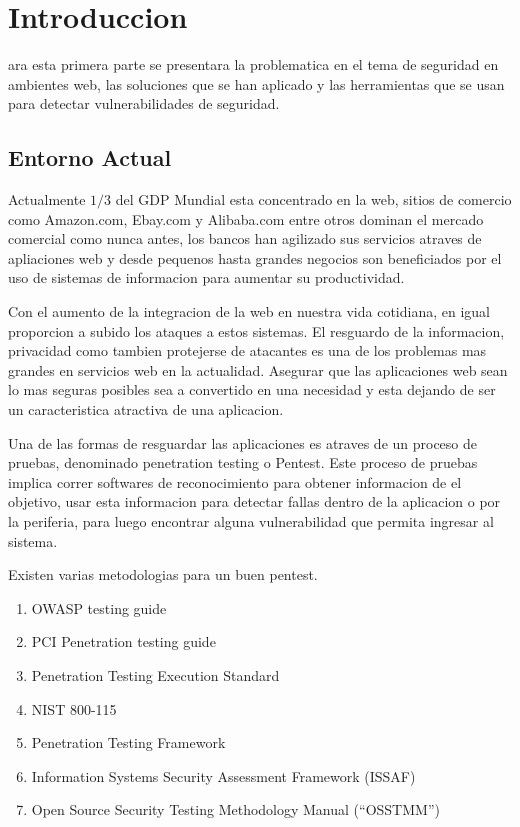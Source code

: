 %
%
\let\textcircled=\pgftextcircled
\chapter{Introduccion}
\label{chap:intro}

ara esta primera parte se presentara la problematica en el tema de seguridad en ambientes web, las soluciones que se han aplicado y las herramientas que se usan para detectar vulnerabilidades de seguridad.

\section{Entorno Actual}
\label{sec:sec01}

Actualmente $1/3$ del GDP Mundial esta concentrado en la web, sitios de comercio como Amazon.com, Ebay.com y Alibaba.com entre otros dominan el mercado comercial como nunca antes, los bancos han agilizado sus servicios atraves de apliaciones web y desde pequenos hasta grandes negocios son beneficiados por el uso de sistemas de informacion para aumentar su productividad.

Con el aumento de la integracion de la web en nuestra vida cotidiana, en igual proporcion a subido los ataques a estos sistemas. El resguardo de la informacion, privacidad como tambien  protejerse de atacantes es una de los problemas mas grandes en servicios web en la actualidad. Asegurar que las aplicaciones web sean lo mas seguras posibles sea a convertido en una necesidad y esta dejando de ser un caracteristica atractiva de una aplicacion.

Una de las formas de resguardar las aplicaciones es atraves de un proceso de pruebas, denominado penetration testing o Pentest. Este proceso de pruebas implica correr softwares de reconocimiento para obtener informacion de el objetivo, usar esta informacion para detectar fallas dentro de la aplicacion o por la periferia, para luego encontrar alguna vulnerabilidad que permita ingresar al sistema.

Existen varias metodologias para un buen pentest. \cite{OWASP}

\begin{enumerate}
\item{OWASP testing guide}
\item{PCI Penetration testing guide}
\item{Penetration Testing Execution Standard}
\item{NIST 800-115}
\item{Penetration Testing Framework}
\item{Information Systems Security Assessment Framework (ISSAF)}
\item{Open Source Security Testing Methodology Manual (“OSSTMM”)}
\end{enumerate}

